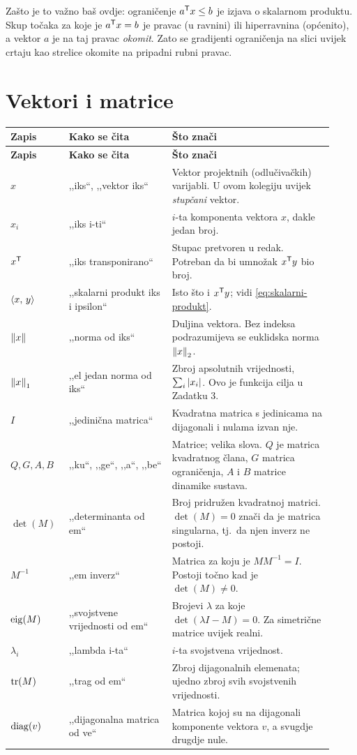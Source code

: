 Zašto je to važno baš ovdje: ograničenje $a^{\mathsf{T}} x \leq b$ je izjava o skalarnom
produktu. Skup točaka za koje je $a^{\mathsf{T}} x = b$ je pravac (u ravnini) ili
hiperravnina (općenito), a vektor $a$ je na taj pravac \emph{okomit}. Zato se
gradijenti ograničenja na slici uvijek crtaju kao strelice okomite na pripadni
rubni pravac.

\section{Vektori i matrice}
\label{sec:vektori-matrice}

\begin{longtable}{@{}p{0.15\linewidth} p{0.30\linewidth} p{0.47\linewidth}@{}}
\toprule
\textbf{Zapis} & \textbf{Kako se čita} & \textbf{Što znači} \\
\midrule
\endfirsthead
\toprule
\textbf{Zapis} & \textbf{Kako se čita} & \textbf{Što znači} \\
\midrule
\endhead
$x$ & ,,iks``, ,,vektor iks`` & Vektor projektnih (odlučivačkih) varijabli. U ovom kolegiju uvijek \emph{stupčani} vektor. \\[4pt]
$x_i$ & ,,iks i-ti`` & $i$-ta komponenta vektora $x$, dakle jedan broj. \\[4pt]
$x^{\mathsf{T}}$ & ,,iks transponirano`` & Stupac pretvoren u redak. Potreban da bi umnožak $x^{\mathsf{T}} y$ bio broj. \\[4pt]
$\left\langle x,\, y \right\rangle$ & ,,skalarni produkt iks i ipsilon`` & Isto što i $x^{\mathsf{T}} y$; vidi \eqref{eq:skalarni-produkt}. \\[4pt]
$\left\lVert x \right\rVert$ & ,,norma od iks`` & Duljina vektora. Bez indeksa podrazumijeva se euklidska norma $\left\lVert x \right\rVert_2$. \\[4pt]
$\left\lVert x \right\rVert_1$ & ,,el jedan norma od iks`` & Zbroj apsolutnih vrijednosti, $\sum_i \left\lvert x_i \right\rvert$. Ovo je funkcija cilja u Zadatku 3. \\[4pt]
$I$ & ,,jedinična matrica`` & Kvadratna matrica s jedinicama na dijagonali i nulama izvan nje. \\[4pt]
$Q, G, A, B$ & ,,ku``, ,,ge``, ,,a``, ,,be`` & Matrice; velika slova. $Q$ je matrica kvadratnog člana, $G$ matrica ograničenja, $A$ i $B$ matrice dinamike sustava. \\[4pt]
$\det(M)$ & ,,determinanta od em`` & Broj pridružen kvadratnoj matrici. $\det(M) = 0$ znači da je matrica singularna, tj.\ da njen inverz ne postoji. \\[4pt]
$M^{-1}$ & ,,em inverz`` & Matrica za koju je $M M^{-1} = I$. Postoji točno kad je $\det(M) \neq 0$. \\[4pt]
$\operatorname{eig}(M)$ & ,,svojstvene vrijednosti od em`` & Brojevi $\lambda$ za koje $\det(\lambda I - M) = 0$. Za simetrične matrice uvijek realni. \\[4pt]
$\lambda_i$ & ,,lambda i-ta`` & $i$-ta svojstvena vrijednost. \\[4pt]
$\operatorname{tr}(M)$ & ,,trag od em`` & Zbroj dijagonalnih elemenata; ujedno zbroj svih svojstvenih vrijednosti. \\[4pt]
$\operatorname{diag}(v)$ & ,,dijagonalna matrica od ve`` & Matrica kojoj su na dijagonali komponente vektora $v$, a svugdje drugdje nule. \\
\bottomrule
\end{longtable}

